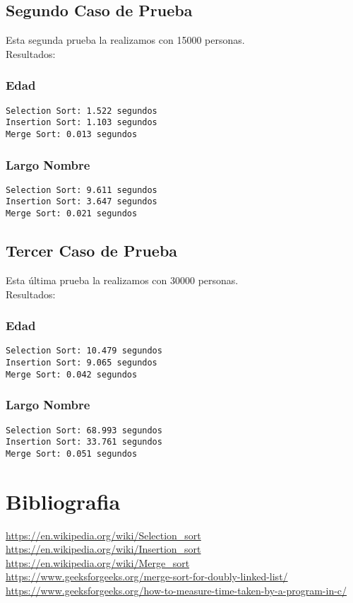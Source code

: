 \documentclass[]{article}
\begin{document}
\subsection{Segundo Caso de Prueba}
Esta segunda prueba la realizamos con 15000 personas.\\
Resultados:

\subsubsection{Edad}
\verb|Selection Sort: 1.522 segundos|\\
\verb|Insertion Sort: 1.103 segundos|\\
\verb|Merge Sort: 0.013 segundos|\\
\subsubsection{Largo Nombre}
\verb|Selection Sort: 9.611 segundos|\\
\verb|Insertion Sort: 3.647 segundos|\\
\verb|Merge Sort: 0.021 segundos|\\

\subsection{Tercer Caso de Prueba}
Esta última prueba la realizamos con 30000 personas.\\
Resultados:

\subsubsection{Edad}
\verb|Selection Sort: 10.479 segundos|\\
\verb|Insertion Sort: 9.065 segundos|\\
\verb|Merge Sort: 0.042 segundos|\\
\subsubsection{Largo Nombre}
\verb|Selection Sort: 68.993 segundos|\\
\verb|Insertion Sort: 33.761 segundos|\\
\verb|Merge Sort: 0.051 segundos|\\
\section{Bibliografia}
\url{https://en.wikipedia.org/wiki/Selection_sort}\\
\url{https://en.wikipedia.org/wiki/Insertion_sort}\\
\url{https://en.wikipedia.org/wiki/Merge_sort}\\
\url{https://www.geeksforgeeks.org/merge-sort-for-doubly-linked-list/}\\
\url{https://www.geeksforgeeks.org/how-to-measure-time-taken-by-a-program-in-c/}\\
\end{document}
